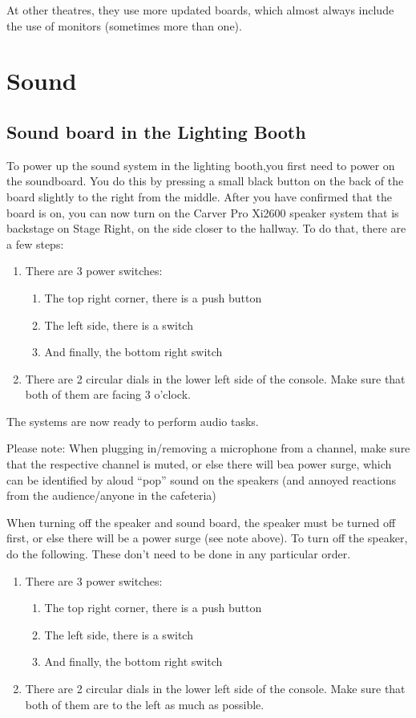 \documentclass{article}
\begin{document}
At other theatres, they use more updated boards, which almost always include the use of monitors (sometimes more than one).

\section{Sound}
\subsection{Sound board in the Lighting Booth}
To power up the sound system in the lighting booth,you first need to power on the soundboard. You do this by pressing a small black button on the back of the board slightly to the right from the middle. After you have confirmed that the board is on, you can now turn on the Carver
Pro Xi2600 speaker system that is backstage on Stage Right, on the side closer to the hallway. To do that, there are a few steps:
\begin{enumerate}
    \item There are 3 power switches:
    \begin{enumerate}
        \item The top right corner, there is a push button
        \item The left side, there is a switch
        \item And finally, the bottom right switch
    \end{enumerate}
    \item There are 2 circular dials in the lower left side of the console. Make sure that both of them are facing 3 o’clock.
\end{enumerate}
The systems are now ready to perform audio tasks.

Please note: When plugging in/removing a microphone from a channel, make sure that the respective channel is muted, or else there will bea power surge, which can be identified by aloud “pop” sound on the speakers (and annoyed reactions from the audience/anyone in the cafeteria)

When turning off the speaker and sound board, the speaker must be turned off first, or else there will be a power surge (see note above). To turn off the speaker, do the following. These don’t need to be done in any particular order.
\begin{enumerate}
    \item There are 3 power switches:
    \begin{enumerate}
        \item The top right corner, there is a push button
        \item The left side, there is a switch
        \item And finally, the bottom right switch
    \end{enumerate}
    \item There are 2 circular dials in the lower left side of the console. Make sure that both of them are to the left as much as possible.
\end{enumerate}
\end{document}
